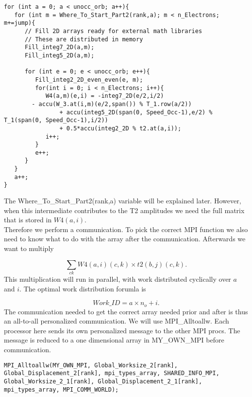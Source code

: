 \documentclass[a4paper,norsk,11pt,twoside]{report}
\begin{document}
\begin{lstlisting}
for (int a = 0; a < unocc_orb; a++){
   for (int m = Where_To_Start_Part2(rank,a); m < n_Electrons; m+=jump){
      // Fill 2D arrays ready for external math libraries
      // These are distributed in memory
      Fill_integ7_2D(a,m);
      Fill_integ5_2D(a,m);

      for (int e = 0; e < unocc_orb; e++){
         Fill_integ2_2D_even_even(e, m);
         for(int i = 0; i < n_Electrons; i++){
            W4(a,m)(e,i) = -integ7_2D(e/2,i/2)
        - accu(W_3.at(i,m)(e/2,span()) % T_1.row(a/2))
                + accu(integ5_2D(span(0, Speed_Occ-1),e/2) % T_1(span(0, Speed_Occ-1),i/2))
                + 0.5*accu(integ2_2D % t2.at(a,i));
            i++;
         }
         e++;
      }
   }
   a++;
}
\end{lstlisting}

The Where\_To\_Start\_Part2(rank,a) variable will be explained later. However, when this intermediate contributes to the T2 amplitudes we need the full matrix that is stored in $W4(a,i)$. \\

Therefore we perform a communication. To pick the correct MPI function we also need to know what to do with the array after the communication. Afterwards we want to multiply

\begin{equation}
\sum_{ck} W4(a,i)(c,k) \times t2(b,j)(c,k)   .\label{gasghashkashfbdbhcxxcnxcruu}
\end{equation}
This multiplication will run in parallel, with work distributed cyclically over $a$ and $i$. The optimal work distribution forumla is

\begin{equation}
Work\_ID = a \times n_o + i .
\end{equation}
The communication needed to get the correct array needed prior and after is thus an all-to-all personalized communication. We will use MPI\_Alltoallw. Each processor here sends its own personalized message to the other MPI procs. The message is reduced to a one dimensional array in MY\_OWN\_MPI before communication. \\

\begin{lstlisting}
MPI_Alltoallw(MY_OWN_MPI, Global_Worksize_2[rank], Global_Displacement_2[rank], mpi_types_array, SHARED_INFO_MPI, Global_Worksize_2_1[rank], Global_Displacement_2_1[rank], mpi_types_array, MPI_COMM_WORLD);
\end{lstlisting}
\end{document}
